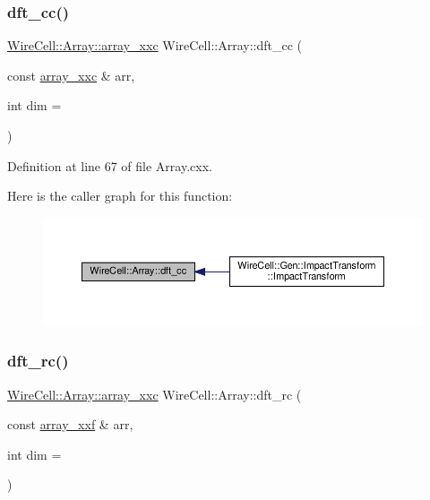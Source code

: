 \subsubsection{\texorpdfstring{dft\+\_\+cc()}{dft\_cc()}}
{\footnotesize\ttfamily \hyperlink{namespace_wire_cell_1_1_array_a4688507545975422d74b9ba78530956a}{Wire\+Cell\+::\+Array\+::array\+\_\+xxc} Wire\+Cell\+::\+Array\+::dft\+\_\+cc (\begin{DoxyParamCaption}\item[{const \hyperlink{namespace_wire_cell_1_1_array_a4688507545975422d74b9ba78530956a}{array\+\_\+xxc} \&}]{arr,  }\item[{int}]{dim = {} }\end{DoxyParamCaption})}



Definition at line 67 of file Array.\+cxx.

Here is the caller graph for this function\+:
\nopagebreak
\begin{figure}[H]
\begin{center}
\leavevmode
\includegraphics[width=350pt]{namespace_wire_cell_1_1_array_a312b7bcf55424009be17c8fd731e85f1_icgraph}
\end{center}
\end{figure}
\mbox{\label{namespace_wire_cell_1_1_array_aa18a99e94f8ba5fdc974ddfdc5778c97}} 
\subsubsection{\texorpdfstring{dft\+\_\+rc()}{dft\_rc()}}
{\footnotesize\ttfamily \hyperlink{namespace_wire_cell_1_1_array_a4688507545975422d74b9ba78530956a}{Wire\+Cell\+::\+Array\+::array\+\_\+xxc} Wire\+Cell\+::\+Array\+::dft\+\_\+rc (\begin{DoxyParamCaption}\item[{const \hyperlink{namespace_wire_cell_1_1_array_ab565fef5e33632bb02f0ed4be803020c}{array\+\_\+xxf} \&}]{arr,  }\item[{int}]{dim = {} }\end{DoxyParamCaption})}

